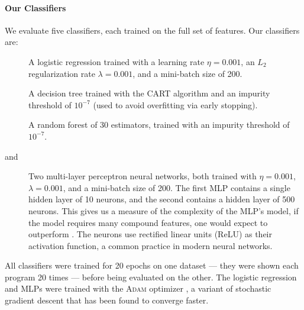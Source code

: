 \paragraph{Our Classifiers}
We evaluate five classifiers, each trained on the full set of features.
%
%
Our classifiers are:
%
\begin{description}
\item[\linear] A logistic regression trained with a learning rate
  $\eta = 0.001$, an $L_2$ regularization rate $\lambda = 0.001$, and a
  mini-batch size of 200.
\item[\dectree] A decision tree trained with the CART algorithm
  \citep{Breiman1984-qy} and an impurity threshold of $10^{-7}$ (used to
  avoid overfitting via early stopping).
\item[\forest] A random forest \citep{Breiman2001-wo} of 30
  estimators, trained with an impurity threshold of $10^{-7}$.
\item[\hiddenT and \hiddenFH] Two multi-layer perceptron neural
  networks, both trained with $\eta = 0.001$, $\lambda = 0.001$, and a
  mini-batch size of 200.
  The first MLP contains a single hidden layer of 10 neurons, and the
  second contains a hidden layer of 500 neurons.
  This gives us a measure of the complexity of the MLP's model, \ie
  if the model requires many compound features, one would expect \hiddenFH
  to outperform \hiddenT.
  The neurons use rectified linear units (ReLU) as their activation
  function, a common practice in modern neural networks.
\end{description}
%
All classifiers were trained for 20 epochs on one dataset
--- \ie they were shown each program 20 times ---
before being evaluated on the other.
%
The logistic regression and MLPs were trained with the \textsc{Adam}
optimizer \citep{Kingma2014-ng}, a variant of stochastic gradient
descent that has been found to converge faster.



